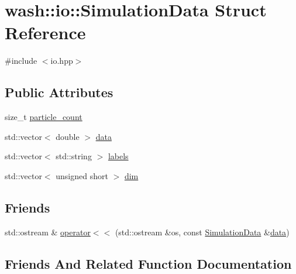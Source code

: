 \hypertarget{structwash_1_1io_1_1SimulationData}{}\section{wash\+:\+:io\+:\+:Simulation\+Data Struct Reference}
\label{structwash_1_1io_1_1SimulationData}


{\ttfamily \#include $<$io.\+hpp$>$}

\subsection*{Public Attributes}
\begin{DoxyCompactItemize}
\item 
size\+\_\+t \mbox{\hyperlink{structwash_1_1io_1_1SimulationData_a21236f5ec63d5f10fedc79860baac63a}{particle\+\_\+count}}
\item 
std\+::vector$<$ double $>$ \mbox{\hyperlink{structwash_1_1io_1_1SimulationData_a6129996b88985d21217e8054e69cdf40}{data}}
\item 
std\+::vector$<$ std\+::string $>$ \mbox{\hyperlink{structwash_1_1io_1_1SimulationData_af41f6f3caf54e0c7eee01b81c29f5617}{labels}}
\item 
std\+::vector$<$ unsigned short $>$ \mbox{\hyperlink{structwash_1_1io_1_1SimulationData_a874b6512db1cf9a349da7a1b202f8dfe}{dim}}
\end{DoxyCompactItemize}
\subsection*{Friends}
\begin{DoxyCompactItemize}
\item 
std\+::ostream \& \mbox{\hyperlink{structwash_1_1io_1_1SimulationData_ada32e2aed3a804ad52036cfe5ffe0540}{operator$<$$<$}} (std\+::ostream \&os, const \mbox{\hyperlink{structwash_1_1io_1_1SimulationData}{Simulation\+Data}} \&\mbox{\hyperlink{structwash_1_1io_1_1SimulationData_a6129996b88985d21217e8054e69cdf40}{data}})
\end{DoxyCompactItemize}


\subsection{Friends And Related Function Documentation}
\mbox{\label{structwash_1_1io_1_1SimulationData_ada32e2aed3a804ad52036cfe5ffe0540}} 

